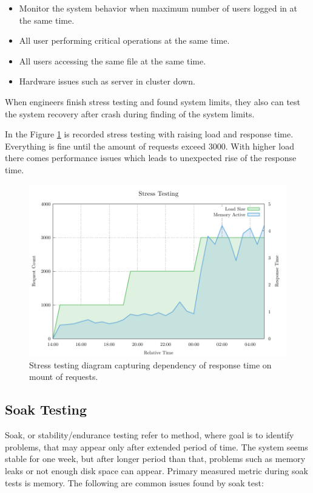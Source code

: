 \begin{itemize}
	\setlength\itemsep{0em}
	\item Monitor the system behavior when maximum number of users logged in at the same time.
	\item All user performing critical operations at the same time.
	\item All users accessing the same file at the same time.
	\item Hardware issues such as server in cluster down.
\end{itemize} 

When engineers finish stress testing and found system limits, they also can test the system recovery after crash during finding of the system limits.

In the Figure \ref{fig:stress_test} is recorded stress testing with raising load and response time. Everything is fine until the amount of requests exceed 3000. With higher load there comes performance issues which leads to unexpected rise of the response time.

\begin{figure}[H]
  \centering
  \includegraphics[width=15cm]{obrazky-figures/stress_testing.pdf}
  \caption{Stress testing diagram capturing dependency of response time on mount of requests.}
  \label{fig:stress_test}
\end{figure}

\subsection*{Soak Testing}
\label{Soak Testing}
Soak, or stability/endurance testing refer to method, where goal is to identify problems, that may appear only after extended period of time. The system seems stable for one week, but after longer period than that, problems such as memory leaks or not enough disk space can appear. Primary measured metric during soak tests is memory. The following are common issues found by soak test:

